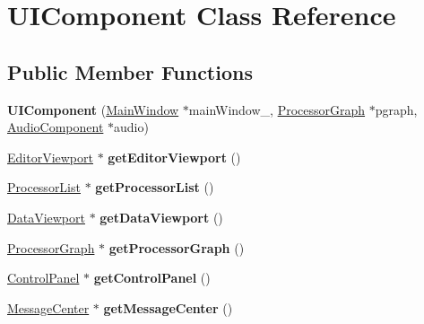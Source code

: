 \hypertarget{classUIComponent}{\section{U\-I\-Component Class Reference}
\label{classUIComponent}
}
\subsection*{Public Member Functions}
\begin{DoxyCompactItemize}
\item 
\hypertarget{classUIComponent_a4fa1a33a7e8d5edc2b60b14ac49639aa}{{\bfseries U\-I\-Component} (\hyperlink{classMainWindow}{Main\-Window} $\ast$main\-Window\-\_\-, \hyperlink{classProcessorGraph}{Processor\-Graph} $\ast$pgraph, \hyperlink{classAudioComponent}{Audio\-Component} $\ast$audio)}\label{classUIComponent_a4fa1a33a7e8d5edc2b60b14ac49639aa}

\item 
\hypertarget{classUIComponent_a764410a9d82b5d45a32e0de989277ce4}{\hyperlink{classEditorViewport}{Editor\-Viewport} $\ast$ {\bfseries get\-Editor\-Viewport} ()}\label{classUIComponent_a764410a9d82b5d45a32e0de989277ce4}

\item 
\hypertarget{classUIComponent_ad12419d300debb7c4386bd4d06118bbc}{\hyperlink{classProcessorList}{Processor\-List} $\ast$ {\bfseries get\-Processor\-List} ()}\label{classUIComponent_ad12419d300debb7c4386bd4d06118bbc}

\item 
\hypertarget{classUIComponent_a811c6b70bca15049bde52d92ddc8b3ba}{\hyperlink{classDataViewport}{Data\-Viewport} $\ast$ {\bfseries get\-Data\-Viewport} ()}\label{classUIComponent_a811c6b70bca15049bde52d92ddc8b3ba}

\item 
\hypertarget{classUIComponent_acd2f9e680aec22ec9ead4e311f744d27}{\hyperlink{classProcessorGraph}{Processor\-Graph} $\ast$ {\bfseries get\-Processor\-Graph} ()}\label{classUIComponent_acd2f9e680aec22ec9ead4e311f744d27}

\item 
\hypertarget{classUIComponent_a8030cf8a31ec7abe27c01dc1ca5049b8}{\hyperlink{classControlPanel}{Control\-Panel} $\ast$ {\bfseries get\-Control\-Panel} ()}\label{classUIComponent_a8030cf8a31ec7abe27c01dc1ca5049b8}

\item 
\hypertarget{classUIComponent_a3990b3973b9f9e6105f2a05e44b02006}{\hyperlink{classMessageCenter}{Message\-Center} $\ast$ {\bfseries get\-Message\-Center} ()}\label{classUIComponent_a3990b3973b9f9e6105f2a05e44b02006}


\end{DoxyCompactItemize}
